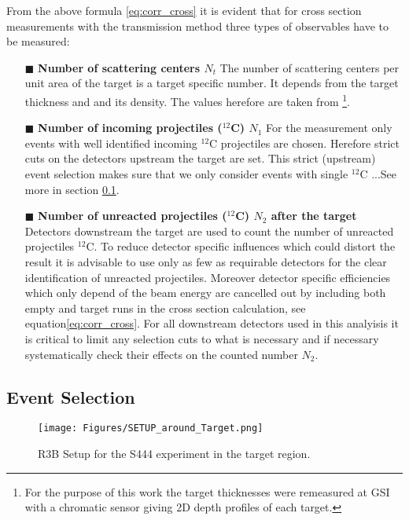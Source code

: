 From the above formula \ref{eq:corr_cross} it is evident that for cross section measurements with the transmission method three types of observables have to be measured:\newline
\begin{enumerate}
\item[$\blacksquare$] \textbf{Number of scattering centers $N_t$}\newline
The number of scattering centers per unit area of the target is a target specific number. It depends from the target thickness and and its density. The values herefore are taken from \cite{ponnath2023precise}\footnote{For the purpose of this work the target thicknesses were remeasured at GSI with a chromatic sensor giving 2D depth profiles of each target.}. 
\item[$\blacksquare$] \textbf{Number of incoming projectiles ($^{12}$C) $N_1$}
For the measurement only events with well identified incoming $^{12}$C projectiles are chosen. Herefore strict cuts on the detectors upstream the target are set. This strict (upstream) event selection makes sure that we only consider events with single $^{12}$C ...See more in section \ref{subsec:event-sel}.  %
\item[$\blacksquare$] \textbf{Number of unreacted projectiles ($^{12}$C) $N_2$ after the target}
Detectors downstream the target are used to count the number of unreacted projectiles $^{12}$C. To reduce detector specific influences which could distort the result it is advisable to use only as few as requirable detectors for the clear identification of unreacted projectiles. Moreover detector specific efficiencies which only depend of the beam energy are cancelled out by including both empty and target runs in the cross section calculation, see equation\ref{eq:corr_cross}. For all downstream detectors used in this analyisis it is critical to limit any selection cuts to what is necessary and if necessary systematically check their effects on the counted number $N_2$.
\end{enumerate}
\subsection{Event Selection}\label{subsec:event-sel}
\begin{figure}[htpb]
    \centering
    \texttt{[image: Figures/SETUP\_around\_Target.png]}
    \caption{
    R3B Setup for the S444 experiment in the target region. 
    }
    \label{fig:setup_target_region}
\end{figure}

